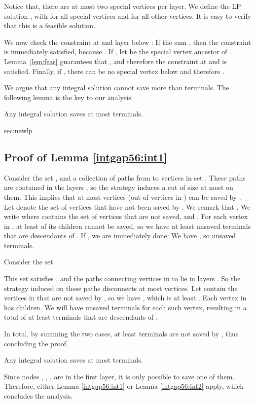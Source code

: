 Notice that, there are at most two special vertices per layer.  
We define the LP solution , with  for all special vertices  and  for all other vertices. 
It is easy to verify that this is a feasible solution.  

We now check the constraint at  and layer  below : If the sum , then the constraint is immediately satisfied, because . 
If , let  be the special vertex ancestor of . 
Lemma~\ref{lem:feas} guarantees that , and therefore the constraint at  and  is satisfied. 
Finally, if , there can be no special vertex below  and therefore .  

\vspace{0.1in} 

We argue that any integral solution cannot save more than  terminals. The following lemma is the key to our analysis. 

\begin{lemma} 
Any integral solution  saves at most  terminals.
\label{intgap56:int1}
\end{lemma} 
\begin{appendixproof}{sec:newlp}{\subsection{Proof of Lemma \ref{intgap56:int1}}}
Consider the set , and a collection of paths from  to vertices in set .  
These paths are contained in the layers , so the strategy  induces a cut of size at most  on them. 
This implies that at most  vertices (out of  vertices in ) can be saved by . 
Let  denote the set of vertices that have not been saved by . We remark that .
We write  where  contains the set of vertices  that are not saved, and .  
For each vertex in , at least  of its children cannot be saved, so we have at least  unsaved terminals that are descendants of .
If , we are immediately done: We have , so  unsaved terminals.  
 
Consider the set 
  
This set satisfies , and the paths connecting vertices in  to  lie in layers .
So the strategy  induced on these paths disconnects at most  vertices.
Let  contain the vertices in  that are not saved by , so we have , which is at least .  
Each vertex in   has  children. We will have  unsaved terminals for each such vertex, resulting in a total of at least  terminals that are descendants of .   

In total, by summing the two cases, at least  terminals are not saved by , thus concluding the proof.  
\end{appendixproof} 

\begin{lemma} 
Any integral solution  saves at most  terminals.
\label{intgap56:int2}
\end{lemma} 


Since nodes , , ,  are in the first layer, it is only
possible to save one of them. Therefore, either Lemma \ref{intgap56:int1} or
Lemma \ref{intgap56:int2} apply, which concludes the analysis.
